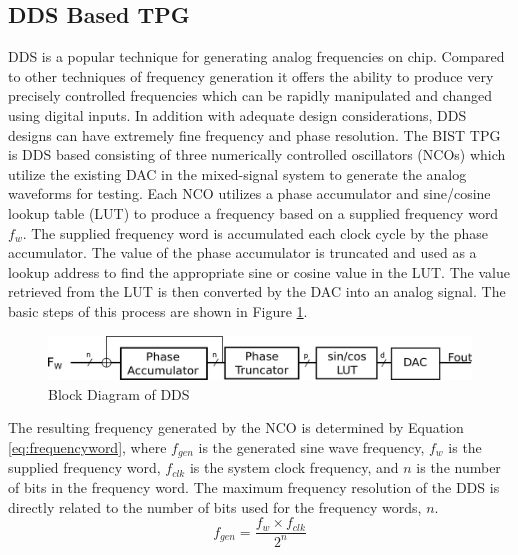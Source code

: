 \documentclass[12pt]{report}
\begin{document}
\subsection{DDS Based TPG}
DDS is a popular technique for generating analog frequencies on chip.  Compared to other techniques of frequency generation it offers the ability to produce very precisely controlled frequencies which can be rapidly manipulated and changed using digital inputs\cite{qi}.  In addition with adequate design considerations, DDS designs can have extremely fine frequency and phase resolution.  The BIST TPG is DDS based consisting of three numerically controlled oscillators (NCOs) which utilize the existing DAC in the mixed-signal system to generate the analog waveforms for testing\cite{testtime}.  Each NCO utilizes a phase accumulator and sine/cosine lookup table (LUT) to produce a frequency based on a supplied frequency word $f_w$. The supplied frequency word is accumulated each clock cycle by the phase accumulator.  The value of the phase accumulator is truncated and used as a lookup address to find the appropriate sine or cosine value in the LUT.  The value retrieved from the LUT is then converted by the DAC into an analog signal.  The basic steps of this process are shown in Figure \ref{fig:dds}.  
\begin{figure}
  \begin{center}
		\includegraphics[scale=.8]{images/dds-steps}
  \end{center}
  \caption{Block Diagram of DDS}
  \label{fig:dds}
\end{figure}
The resulting frequency generated by the NCO is determined by Equation \ref{eq:frequencyword}, where $f_{gen}$ is the generated sine wave frequency, $f_w$ is the supplied frequency word, $f_{clk}$ is the system clock frequency, and $n$ is the number of bits in the frequency word.  The maximum frequency resolution of the DDS is directly related to the number of bits used for the frequency words, $n$.
\begin{equation}
	f_{gen} = \frac{f_w \times f_{clk}}{2^{n}}
	\label{eq:frequencyword}
\end{equation}
\end{document}
